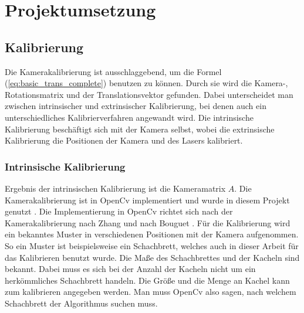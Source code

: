 \section{Projektumsetzung}\label{ergebnisse}
	\subsection{Kalibrierung}
		Die Kamerakalibrierung ist ausschlaggebend, um die Formel (\ref{eq:basic_trans_complete}) benutzen zu können. Durch sie wird die Kamera-, Rotationsmatrix und der Translationsvektor gefunden. Dabei unterscheidet man zwischen intrinsischer und extrinsischer Kalibrierung, bei denen auch ein unterschiedliches Kalibrierverfahren angewandt wird. Die intrinsische Kalibrierung beschäftigt sich mit der Kamera selbst, wobei die extrinsische Kalibrierung die Positionen der Kamera und des Lasers kalibriert.
		
		\label{chap:kalibierung}
		\subsubsection{Intrinsische Kalibrierung}
		Ergebnis der intrinsischen Kalibrierung ist die Kameramatrix \( A \). Die Kamerakalibrierung ist in OpenCv implementiert und wurde in diesem Projekt genutzt \citep[vgl.][]{noauthor_opencv_nodate-1}. Die Implementierung in OpenCv richtet sich nach der Kamerakalibrierung nach Zhang \citep[vgl.][]{zhang_flexible_2000} und nach Bouguet \citep[vgl.][]{bouguet}. \newline
		Für die Kalibrierung wird ein bekanntes Muster in verschiedenen Positionen mit der Kamera aufgenommen. So ein Muster ist beispielsweise ein Schachbrett, welches auch in dieser Arbeit für das Kalibrieren benutzt wurde. Die Maße des Schachbrettes und der Kacheln sind bekannt. Dabei muss es sich bei der Anzahl der Kacheln nicht um ein herkömmliches Schachbrett handeln. Die Größe und die Menge an Kachel kann zum kalibrieren angegeben werden. Man muss OpenCv also sagen, nach welchem Schachbrett der Algorithmus suchen muss.
		
